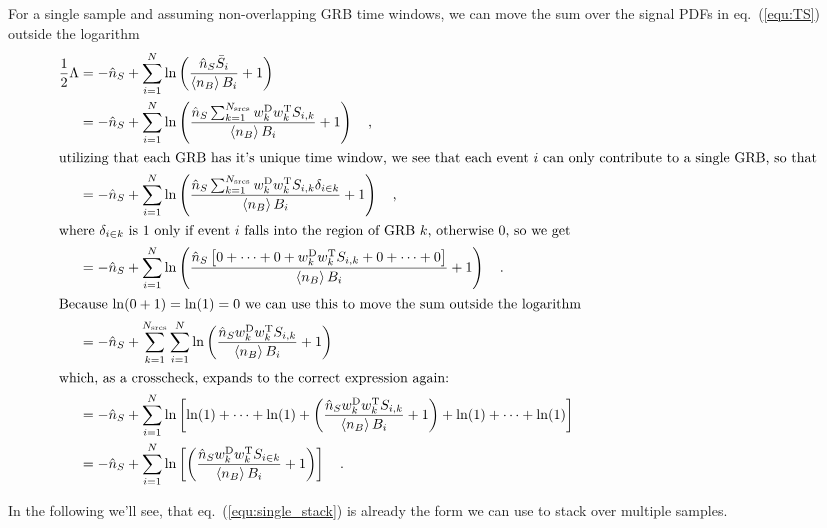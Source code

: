 For a single sample and assuming non-overlapping GRB time windows, we can move the sum over the signal PDFs in eq.~(\ref{equ:TS}) outside the logarithm
\begin{align}
  \frac{1}{2}\Lambda
    &= -\hat{n}_S + \sum_{i=1}^N \ln\left(\frac{\hat{n}_S\bar{S}_i}
                                               {\Braket{n_B} B_i} + 1\right) \\
    &= -\hat{n}_S + \sum_{i=1}^N \ln\left(
          \frac{\hat{n}_S\sum_{k=1}^{N_\text{srcs}}
                w_k^\text{D}w_k^\text{T}S_{i,k}}
               {\Braket{n_B} B_i} + 1\right) \quad\text{,} \\
  \intertext{utilizing that each GRB has it's unique time window, we see that each event $i$ can only contribute to a single GRB, so that}
    &= -\hat{n}_S + \sum_{i=1}^N \ln\left(
          \frac{\hat{n}_S\sum_{k=1}^{N_\text{srcs}}
                w_k^\text{D}w_k^\text{T}S_{i,k}\delta_{i\in k}}
               {\Braket{n_B} B_i} + 1\right) \quad\text{,} \\
  \intertext{where $\delta_{i\in k}$ is $1$ only if event $i$ falls into the region of GRB $k$, otherwise $0$, so we get}
    &= -\hat{n}_S + \sum_{i=1}^N \ln\left(
          \frac{\hat{n}_S
                \left[0 + \dots + 0 +
                      w_k^\text{D}w_k^\text{T}S_{i,k} +
                      0 + \dots + 0\right]}
               {\Braket{n_B} B_i} + 1\right) \quad\text{.} \\
  \intertext{Because $\ln(0+1) = \ln(1) = 0$ we can use this to move the sum outside the logarithm}
    &= -\hat{n}_S + \sum_{k=1}^{N_\text{srcs}}\sum_{i=1}^N \ln\left(
          \frac{\hat{n}_S w_k^\text{D}w_k^\text{T}S_{i,k}}
               {\Braket{n_B} B_i} + 1\right)  \label{equ:single_stack} \\
  \intertext{which, as a crosscheck, expands to the correct expression again:}
    &= -\hat{n}_S + \sum_{i=1}^N \ln\left[
          \ln(1) + \dots + \ln(1) +
          \left( \frac{\hat{n}_S w_k^\text{D}w_k^\text{T}S_{i,k}}
                      {\Braket{n_B} B_i} + 1\right) +
          \ln(1) + \dots + \ln(1) \right] \\
    &= -\hat{n}_S + \sum_{i=1}^N \ln\left[ \left(
          \frac{\hat{n}_S w_k^\text{D}w_k^\text{T}S_{i\in k}}
               {\Braket{n_B} B_i} + 1\right) \right] \quad\text{.}
\end{align}

In the following we'll see, that eq.~(\ref{equ:single_stack}) is already the form we can use to stack over multiple samples.


